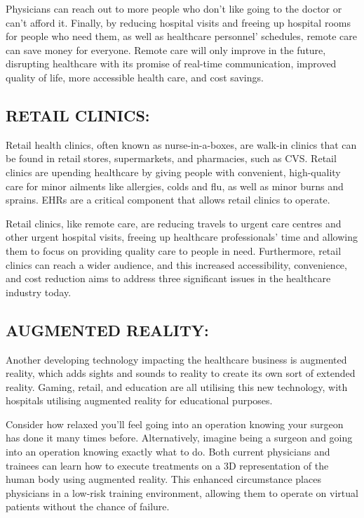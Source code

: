 \documentclass[12pt]{article}
\begin{document}
Physicians can reach out to more people who don't like going to the doctor or can't afford it. Finally, by reducing hospital visits and freeing up hospital rooms for people who need them, as well as healthcare personnel' schedules, remote care can save money for everyone. Remote care will only improve in the future, disrupting healthcare with its promise of real-time communication, improved quality of life, more accessible health care, and cost savings.



\subsection{RETAIL CLINICS:}

Retail health clinics, often known as nurse-in-a-boxes, are walk-in clinics that can be found in retail stores, supermarkets, and pharmacies, such as CVS. Retail clinics are upending healthcare by giving people with convenient, high-quality care for minor ailments like allergies, colds and flu, as well as minor burns and sprains. EHRs are a critical component that allows retail clinics to operate.


Retail clinics, like remote care, are reducing travels to urgent care centres and other urgent hospital visits, freeing up healthcare professionals' time and allowing them to focus on providing quality care to people in need. Furthermore, retail clinics can reach a wider audience, and this increased accessibility, convenience, and cost reduction aims to address three significant issues in the healthcare industry today.



\subsection{AUGMENTED REALITY:}

Another developing technology impacting the healthcare business is augmented reality, which adds sights and sounds to reality to create its own sort of extended reality. Gaming, retail, and education are all utilising this new technology, with hospitals utilising augmented reality for educational purposes.


Consider how relaxed you'll feel going into an operation knowing your surgeon has done it many times before. Alternatively, imagine being a surgeon and going into an operation knowing exactly what to do. Both current physicians and trainees can learn how to execute treatments on a 3D representation of the human body using augmented reality. This enhanced circumstance places physicians in a low-risk training environment, allowing them to operate on virtual patients without the chance of failure.
\end{document}
